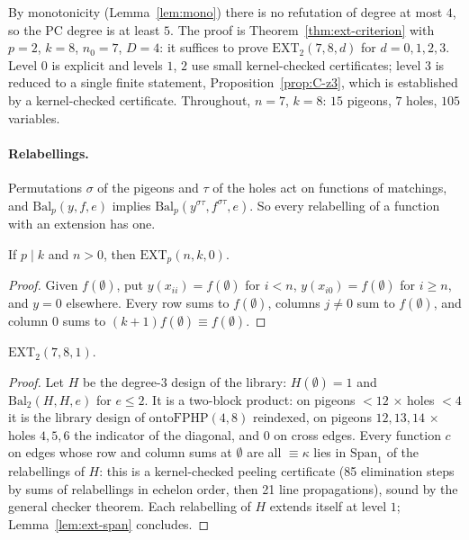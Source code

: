 By monotonicity (Lemma~\ref{lem:mono}) there is no refutation of degree at most $4$, so the PC degree is at
least $5$.  The proof is Theorem~\ref{thm:ext-criterion} with $p=2$, $k=8$,
$n_0=7$, $D=4$: it suffices to prove $\mathrm{EXT}_2(7,8,d)$ for $d=0,1,2,3$.
Level $0$ is explicit and levels $1$, $2$ use small kernel-checked certificates; level $3$ is reduced to a single finite
statement, Proposition~\ref{prop:C-z3}, which is established by a kernel-checked
certificate.  Throughout, $n=7$, $k=8$: $15$ pigeons, $7$ holes, $105$ variables.

\paragraph{Relabellings.}  Permutations $\sigma$ of the pigeons and $\tau$ of the
holes act on functions of matchings, and $\mathrm{Bal}_p(y,f,e)$ implies
$\mathrm{Bal}_p(y^{\sigma\tau},f^{\sigma\tau},e)$.
So every relabelling of a function with an extension has one.

\begin{lemma}[level 0]\label{lem:C0}
If $p\mid k$ and $n>0$, then $\mathrm{EXT}_p(n,k,0)$.
\end{lemma}

\begin{proof}
Given $f(\emptyset)$, put $y(x_{ii})=f(\emptyset)$ for $i<n$,
$y(x_{i0})=f(\emptyset)$ for $i\ge n$, and $y=0$ elsewhere.  Every row sums to
$f(\emptyset)$, columns $j\ne0$ sum to $f(\emptyset)$, and column $0$ sums to
$(k+1)f(\emptyset)\equiv f(\emptyset)$.
\end{proof}

\begin{lemma}[level 1]\label{lem:C1}
$\mathrm{EXT}_2(7,8,1)$.
\end{lemma}

\begin{proof}
Let $H$ be the degree-$3$ design of the library: $H(\emptyset)=1$ and
$\mathrm{Bal}_2(H,H,e)$ for $e\le2$.  It is a
two-block product: on pigeons $<12$ $\times$ holes $<4$ it is the library design of
$\mathrm{ontoFPHP}(4,8)$ reindexed, on pigeons $12,13,14$ $\times$ holes $4,5,6$ the
indicator of the diagonal, and $0$ on cross edges.  Every function $c$ on edges
whose row and column sums at $\emptyset$ are all $\equiv\kappa$ lies in
$\mathrm{Span}_1$ of the relabellings of $H$: this is a kernel-checked peeling
certificate (85 elimination steps by sums of relabellings in echelon order, then
21 line propagations), sound by the general checker
theorem.
Each relabelling of $H$ extends itself at level $1$; Lemma~\ref{lem:ext-span}
concludes.
\end{proof}

